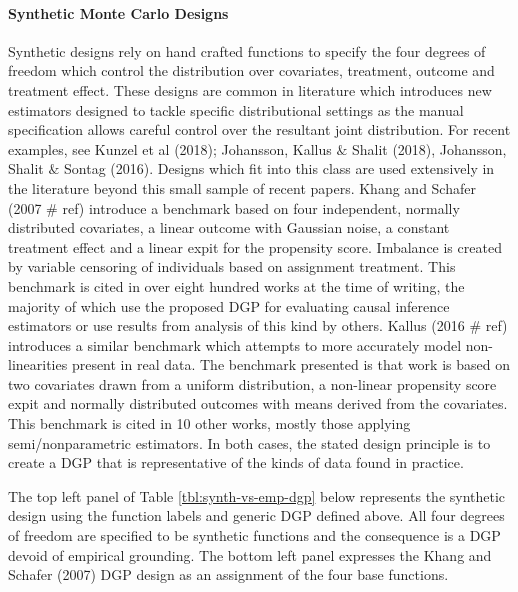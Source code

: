 \documentclass[../main.tex]{subfiles}
\begin{document}
\vspace{\baselineskip}
\paragraph*{Synthetic Monte Carlo Designs}\par


\vspace{\baselineskip}
Synthetic designs rely on hand crafted functions to specify the four degrees of freedom which control the distribution over covariates, treatment, outcome and treatment effect. These designs are common in literature which introduces new estimators designed to tackle specific distributional settings as the manual specification allows careful control over the resultant joint distribution. For recent examples, see Kunzel et al (2018); Johansson, Kallus $\&$  Shalit (2018), Johansson, Shalit $\&$  Sontag (2016). Designs which fit into this class are used extensively in the literature beyond this small sample of recent papers. Khang and Schafer (2007 $\#$ ref) introduce a benchmark based on four independent, normally distributed covariates, a linear outcome with Gaussian noise, a constant treatment effect and a linear expit for the propensity score. Imbalance is created by variable censoring of individuals based on assignment treatment. This benchmark is cited in over eight hundred works at the time of writing, the majority of which use the proposed DGP for evaluating causal inference estimators or use results from analysis of this kind by others. Kallus (2016 $\#$ ref) introduces a similar benchmark which attempts to more accurately model non-linearities present in real data. The benchmark presented is that work is based on two covariates drawn from a uniform distribution, a non-linear propensity score expit and normally distributed outcomes with means derived from the covariates. This benchmark is cited in 10 other works, mostly those applying semi/nonparametric estimators. In both cases, the stated design principle is to create a DGP that is representative of the kinds of data found in practice.\par


\vspace{\baselineskip}
The top left panel of Table \ref{tbl:synth-vs-emp-dgp} below represents the synthetic design using the function labels and generic DGP defined above. All four degrees of freedom are specified to be synthetic functions and the consequence is a DGP devoid of empirical grounding. The bottom left panel expresses the Khang and Schafer (2007) DGP design as an assignment of the four base functions.\par
\end{document}
